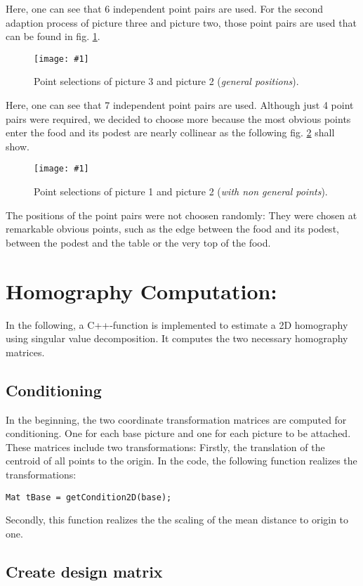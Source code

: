 \documentclass[a4paper,headings=small]{scrartcl}
\numberwithin{equation}{section} %
\numberwithin{figure}{section}   %
\newcommand{\image}[3]{
	\begin{figure}[htbp]
		\centering
		\texttt{[image: \#1]}
		\caption{#3}
		\label{fig:#1}
	\end{figure}
}
\begin{document}
Here, one can see that 6 independent point pairs are used.
For the second adaption process of picture three and picture two,
those point pairs are used that can be found in fig. \ref{fig:../../../target/general_selection_2}.

\image{../../../target/general_selection_2}{0.6}{%
		Point selections of picture 3 and picture 2 (\emph{general positions}).}

Here, one can see that 7 independent point pairs are used.
Although just 4 point pairs were required, we decided to choose more
because the most obvious points enter the food and its podest are nearly collinear
as the following fig. \ref{fig:../../../target/nonGeneral_selection_1} shall show.

\image{../../../target/nonGeneral_selection_1}{0.6}{%
		Point selections of picture 1 and picture 2 (\emph{with non general points}).}

The positions of the point pairs were not choosen randomly: They were chosen 
at remarkable obvious points, such as the edge between the food and its podest, 
between the podest and the table or the very top of the food.


\section{Homography Computation:}

In the following, a C++-function is implemented to estimate a 2D homography using singular value
decomposition. It computes the two necessary homography matrices.

  \subsection{Conditioning}

In the beginning, the two coordinate transformation matrices are computed for conditioning.
One for each base picture and one for each picture to be attached.
These matrices include two transformations: 
Firstly, the translation of the centroid of all points to the origin.
In the code, the following function realizes the transformations:
\begin{lstlisting}
Mat tBase = getCondition2D(base);
\end{lstlisting}
Secondly, this function realizes the the scaling of the mean distance to origin to one.

  \subsection{Create design matrix}
\end{document}
